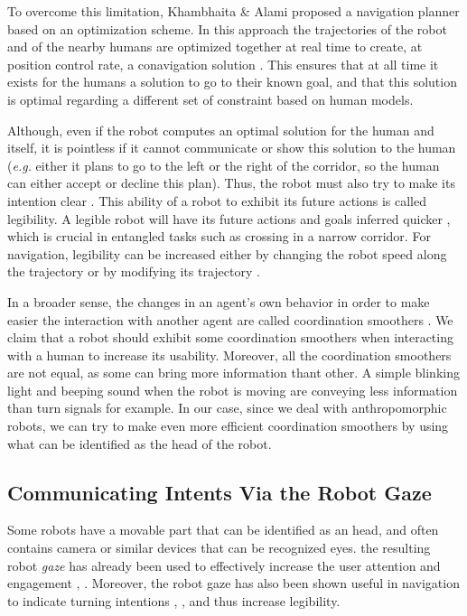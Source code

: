 \documentclass[a4paper,11pt,twoside]{StyleThese}
\begin{document}
To overcome this limitation, Khambhaita \& Alami proposed a navigation planner based on an optimization scheme. In this approach the trajectories of the robot and of the nearby humans are optimized together at real time to create, at position control rate, a conavigation solution \cite{khambhaita_viewing_2017}. This ensures that at all time it exists for the humans a solution to go to their known goal, and that this solution is optimal regarding a different set of constraint based on human models.

Although, even if the robot computes an optimal solution for the human and itself, it is pointless if it cannot communicate or show this solution to the human (\textit{e.g.} either it plans to go to the left or the right of the corridor, so the human can either accept or decline this plan). Thus, the robot must also try to make its intention clear \cite{pacchierotti_evaluation_2006}. This ability of a robot to exhibit its future actions is called legibility. A legible robot will have its future actions and goals inferred quicker \cite{dragan_legibility_2013}, which is crucial in entangled tasks such as crossing in a narrow corridor. For navigation, legibility can be increased either by changing the robot speed along the trajectory \cite{kruse_legible_2012} or by modifying its trajectory \cite{khambhaita_viewing_2017}.

In a broader sense, the changes in an agent's own behavior in order to make easier the interaction with another agent are called coordination smoothers \cite{vesper_minimal_2010}. We claim that a robot should exhibit some coordination smoothers when interacting with a human to increase its usability. Moreover, all the coordination smoothers are not equal, as some can bring more information thant other. A simple blinking light and beeping sound when the robot is moving are conveying less information than turn signals for example. In our case, since we deal with anthropomorphic robots, we can try to make even more efficient coordination smoothers by using what can be identified as the head of the robot.

\subsection{Communicating Intents Via the Robot Gaze} 
Some robots have a movable part that can be identified as an head, and often contains camera or similar devices that can be recognized eyes. the resulting robot \textit{gaze} has already been used to effectively increase the user attention and engagement \cite{mutlu_storytelling_2006}, \cite{zaraki_designing_2014}. Moreover, the robot gaze has also been shown useful in navigation to indicate turning intentions \cite{lu_towards_2013}, \cite{may_show_2015}, and thus increase legibility.
\end{document}
